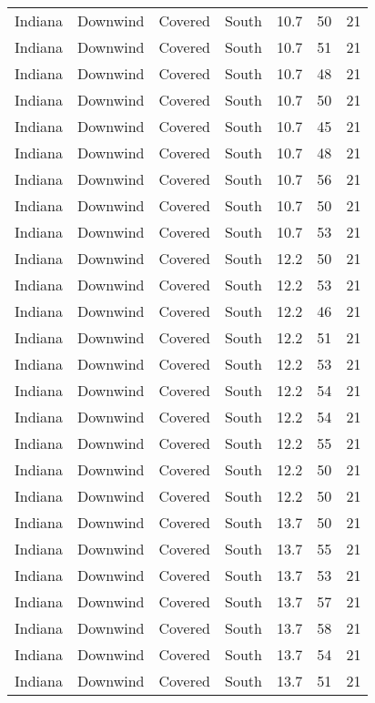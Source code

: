 \documentclass{article}
\begin{document}
\begin{longtable}[H]{ccccccc}
Indiana & Downwind & Covered     & South  & 10.7 & 50 & 21 \\
Indiana & Downwind & Covered     & South  & 10.7 & 51 & 21 \\
Indiana & Downwind & Covered     & South  & 10.7 & 48 & 21 \\
Indiana & Downwind & Covered     & South  & 10.7 & 50 & 21 \\
Indiana & Downwind & Covered     & South  & 10.7 & 45 & 21 \\
Indiana & Downwind & Covered     & South  & 10.7 & 48 & 21 \\
Indiana & Downwind & Covered     & South  & 10.7 & 56 & 21 \\
Indiana & Downwind & Covered     & South  & 10.7 & 50 & 21 \\
Indiana & Downwind & Covered     & South  & 10.7 & 53 & 21 \\
Indiana & Downwind & Covered     & South  & 12.2 & 50 & 21 \\
Indiana & Downwind & Covered     & South  & 12.2 & 53 & 21 \\
Indiana & Downwind & Covered     & South  & 12.2 & 46 & 21 \\
Indiana & Downwind & Covered     & South  & 12.2 & 51 & 21 \\
Indiana & Downwind & Covered     & South  & 12.2 & 53 & 21 \\
Indiana & Downwind & Covered     & South  & 12.2 & 54 & 21 \\
Indiana & Downwind & Covered     & South  & 12.2 & 54 & 21 \\
Indiana & Downwind & Covered     & South  & 12.2 & 55 & 21 \\
Indiana & Downwind & Covered     & South  & 12.2 & 50 & 21 \\
Indiana & Downwind & Covered     & South  & 12.2 & 50 & 21 \\
Indiana & Downwind & Covered     & South  & 13.7 & 50 & 21 \\
Indiana & Downwind & Covered     & South  & 13.7 & 55 & 21 \\
Indiana & Downwind & Covered     & South  & 13.7 & 53 & 21 \\
Indiana & Downwind & Covered     & South  & 13.7 & 57 & 21 \\
Indiana & Downwind & Covered     & South  & 13.7 & 58 & 21 \\
Indiana & Downwind & Covered     & South  & 13.7 & 54 & 21 \\
Indiana & Downwind & Covered     & South  & 13.7 & 51 & 21 \\

\end{longtable}
\end{document}
